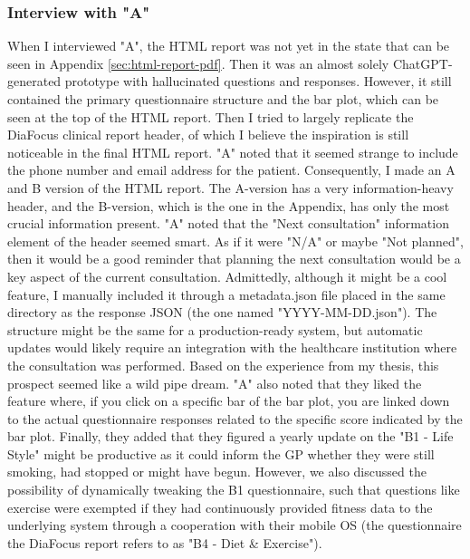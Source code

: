\subsubsection*{Interview with "A"}
When I interviewed "A", the HTML report was not yet in the state that can be seen in Appendix \autoref{sec:html-report-pdf}. Then it was an almost solely ChatGPT-generated prototype with hallucinated questions and responses. However, it still contained the primary questionnaire structure and the bar plot, which can be seen at the top of the HTML report. Then I tried to largely replicate the DiaFocus clinical report header, of which I believe the inspiration is still noticeable in the final HTML report. "A" noted that it seemed strange to include the phone number and email address for the patient. Consequently, I made an A and B version of the HTML report. The A-version has a very information-heavy header, and the B-version, which is the one in the Appendix, has only the most crucial information present. "A" noted that the "Next consultation" information element of the header seemed smart. As if it were "N/A" or maybe "Not planned", then it would be a good reminder that planning the next consultation would be a key aspect of the current consultation. Admittedly, although it might be a cool feature, I manually included it through a metadata.json file placed in the same directory as the response JSON (the one named "YYYY-MM-DD.json"). The structure might be the same for a production-ready system, but automatic updates would likely require an integration with the healthcare institution where the consultation was performed. Based on the experience from my thesis, this prospect seemed like a wild pipe dream. "A" also noted that they liked the feature where, if you click on a specific bar of the bar plot, you are linked down to the actual questionnaire responses related to the specific score indicated by the bar plot. Finally, they added that they figured a yearly update on the "B1 - Life Style" might be productive as it could inform the GP whether they were still smoking, had stopped or might have begun. However, we also discussed the possibility of dynamically tweaking the B1 questionnaire, such that questions like exercise were exempted if they had continuously provided fitness data to the underlying system through a cooperation with their mobile OS (the questionnaire the DiaFocus report refers to as "B4 - Diet \& Exercise").  

